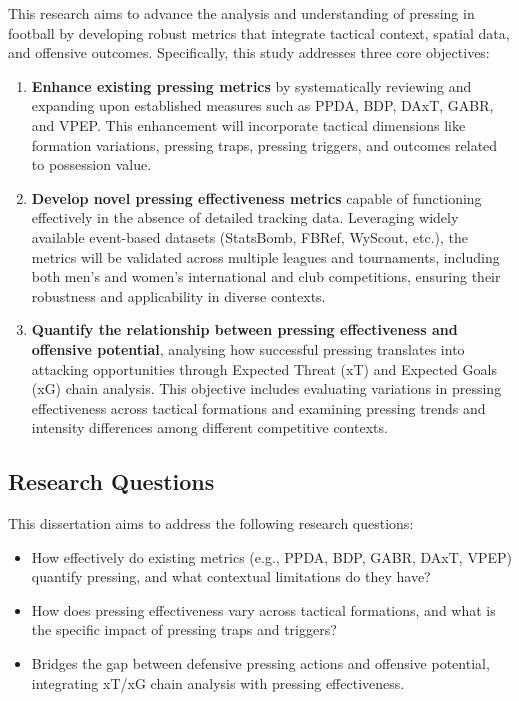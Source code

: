 \documentclass[12pt]{article}
\begin{document}
This research aims to advance the analysis and understanding of pressing in football by developing robust metrics that integrate tactical context, spatial data, and offensive outcomes. Specifically, this study addresses three core objectives:
\begin{enumerate}
    \item \textbf{Enhance existing pressing metrics} by systematically reviewing and expanding upon established measures such as PPDA, BDP, DAxT, GABR, and VPEP. This enhancement will incorporate tactical dimensions like formation variations, pressing traps, pressing triggers, and outcomes related to possession value.
    \item \textbf{Develop novel pressing effectiveness metrics} capable of functioning effectively in the absence of detailed tracking data. Leveraging widely available event-based datasets (StatsBomb, FBRef, WyScout, etc.), the metrics will be validated across multiple leagues and tournaments, including both men's and women's international and club competitions, ensuring their robustness and applicability in diverse contexts.
    \item \textbf{Quantify the relationship between pressing effectiveness and offensive potential}, analysing how successful pressing translates into attacking opportunities through Expected Threat (xT) and Expected Goals (xG) chain analysis. This objective includes evaluating variations in pressing effectiveness across tactical formations and examining pressing trends and intensity differences among different competitive contexts.
\end{enumerate}

\subsection{Research Questions}

This dissertation aims to address the following research questions:
\begin{itemize}
    \item How effectively do existing metrics (e.g., PPDA, BDP, GABR, DAxT, VPEP) quantify pressing, and what contextual limitations do they have?
    \item How does pressing effectiveness vary across tactical formations, and what is the specific impact of pressing traps and triggers?
    \item Bridges the gap between defensive pressing actions and offensive potential, integrating xT/xG chain analysis with pressing effectiveness.
\end{itemize}
\end{document}
